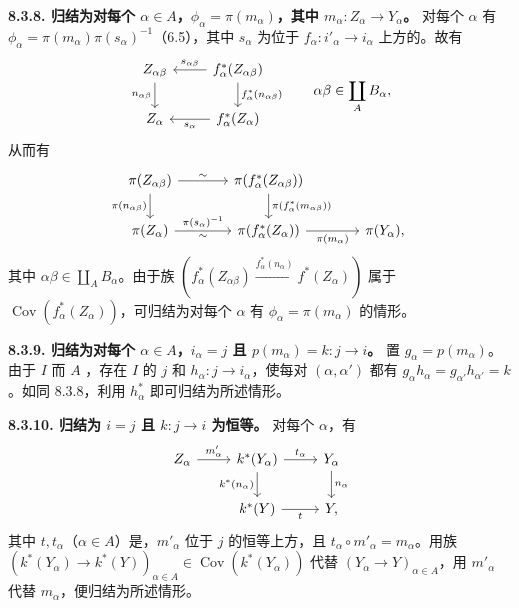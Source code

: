 \textbf{8.3.8. 归结为对每个 $\alpha\in A$，$\phi_\alpha=\pi(m_\alpha)$，其中 $m_\alpha:Z_\alpha\to Y_\alpha$。} 对每个 $\alpha$ 有 $\phi_\alpha=\pi(m_\alpha)\pi(s_\alpha)^{-1}$（6.5），其中 $s_\alpha$ 为位于 $f_\alpha:i'_\alpha\to i_\alpha$ 上方的。故有
\[\begin{tikzcd}
Z_{\alpha\beta}\arrow[d,"n_{\alpha\beta}"']&f_\alpha^*(Z_{\alpha\beta})\arrow[l,"s_{\alpha\beta}"']\arrow[d,"f_\alpha^*(n_{\alpha\beta})"]\\
Z_\alpha&f_\alpha^*(Z_\alpha)\arrow[l,"s_\alpha"]
\end{tikzcd}\qquad\alpha\beta\in\coprod_A B_\alpha,\]
从而有
\[\begin{tikzcd}[column sep=large]
\pi(Z_{\alpha\beta})\arrow[r,"\sim"]\arrow[d,"\pi(n_{\alpha\beta})"']&\pi(f_\alpha^*(Z_{\alpha\beta}))\arrow[d,"\pi(f_\alpha^*(m_{\alpha\beta}))"]&\\
\pi(Z_\alpha)\arrow[r,"\pi(s_\alpha)^{-1}","\sim"']&\pi(f_\alpha^*(Z_\alpha))\arrow[r,"\pi(m_\alpha)"']&\pi(Y_\alpha),
\end{tikzcd}\]
其中 $\alpha\beta\in\coprod_A B_\alpha$。由于族 $(f_\alpha^*(Z_{\alpha\beta})\xrightarrow{f_\alpha^*(n_\alpha)}f^*(Z_\alpha))$ 属于 $\operatorname{Cov}(f_\alpha^*(Z_\alpha))$，可归结为对每个 $\alpha$ 有 $\phi_\alpha=\pi(m_\alpha)$ 的情形。

\textbf{8.3.9. 归结为对每个 $\alpha\in A$，$i_\alpha=j$ 且 $p(m_\alpha)=k:j\to i$。} 置 $g_\alpha=p(m_\alpha)$。由于 $I$ 而 $A$ ，存在 $I$ 的 $j$ 和 $h_\alpha:j\to i_\alpha$，使每对 $(\alpha,\alpha')$ 都有 $g_\alpha h_\alpha=g_{\alpha'}h_{\alpha'}=k$。如同 8.3.8，利用 $h_\alpha^*$ 即可归结为所述情形。

\textbf{8.3.10. 归结为 $i=j$ 且 $k:j\to i$ 为恒等。} 对每个 $\alpha$，有
\[\begin{tikzcd}
Z_\alpha\arrow[r,"m'_\alpha"]&k^*(Y_\alpha)\arrow[r,"t_\alpha"]\arrow[d,"k^*(n_\alpha)"']&Y_\alpha\arrow[d,"n_\alpha"]\\
&k^*(Y)\arrow[r,"t"']&Y,
\end{tikzcd}\]
其中 $t,t_\alpha$（$\alpha\in A$）是，$m'_\alpha$ 位于 $j$ 的恒等上方，且 $t_\alpha\circ m'_\alpha=m_\alpha$。用族 $(k^*(Y_\alpha)\to k^*(Y))_{\alpha\in A}\in\operatorname{Cov}(k^*(Y_\alpha))$ 代替 $(Y_\alpha\to Y)_{\alpha\in A}$，用 $m'_\alpha$ 代替 $m_\alpha$，便归结为所述情形。

